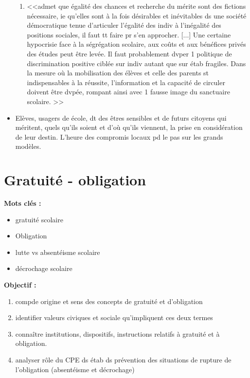 \documentclass[12pt]{report}
\begin{document}
\begin{itemize}
{\begin{minipage}{19cm}
\begin{enumerate}
\item <<admet que égalité des chances et recherche du mérite sont des fictions nécessaire, ie qu'elles sont à la fois désirables et inévitables ds une société démocratique tenue d'articuler l'égalité des indiv à l'inégalité des positions sociales, il faut tt faire pr s'en approcher. [...] Une certaine hypocrisie face à la ségrégation scolaire, aux coûts et aux bénéfices privés des études peut être levée. Il faut probablement dvper 1 politique de discrimination positive ciblée sur indiv autant que sur étab fragiles. Dans la mesure où la mobilisation des élèves et celle des parents st indispensables à la réussite, l'information et la capacité de circuler doivent être dvpée, rompant ainsi avec 1 fausse image du sanctuaire scolaire. >>
\end{enumerate}
\end{minipage}
}

\vspace{0.5cm}

\item Elèves, usagers de école, dt des êtres sensibles et de futurs citoyens qui méritent, quels qu'ils soient et d'où qu'ils viennent, la prise en considération de leur destin. L'heure des compromis locaux pd le pas sur les grands modèles.

\end{itemize}

\chapter{Gratuité - obligation}

\textbf{Mots clés : }
\begin{itemize}
\item gratuité scolaire
\item Obligation
\item lutte vs absentéisme scolaire
\item décrochage scolaire
\end{itemize}

\vspace{0.5cm}

\textbf{Objectif :}


\begin{enumerate}
\item compde origine et sens des concepts de gratuité et d'obligation
\item identifier valeurs civiques et sociale qu'impliquent ces deux termes
\item connaître institutions, dispositifs, instructions relatifs à gratuité et à obligation.
\item analyser rôle du CPE ds étab ds prévention des situations de rupture de l'obligation (absentéisme et décrochage)\\
\end{enumerate}
\end{document}
